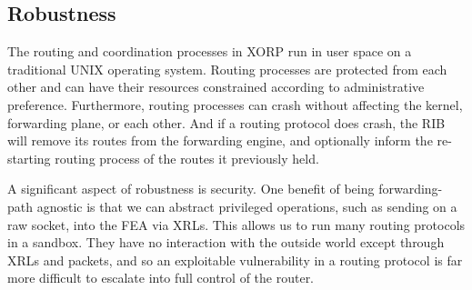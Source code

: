 \noindent{}

\subsection{Robustness}

The routing and coordination processes in XORP run in user space on a
traditional UNIX operating system.  Routing processes are protected
from each other and can have their resources constrained according to
administrative preference.  Furthermore, routing processes can crash
without affecting the kernel, forwarding plane, or each other.  And if
a routing protocol does crash, the RIB will remove its routes
from the forwarding engine, and optionally inform the re-starting
routing process of the routes it previously held.


A significant aspect of robustness is security.  One benefit of
being forwarding-path agnostic is that we can abstract
privileged operations, such as sending on a raw socket, into
the FEA via XRLs.  This allows us to run many routing protocols
in a sandbox. They have no interaction with the outside world except
through XRLs and packets, and so an exploitable vulnerability in a routing
protocol is far more difficult to escalate into full control of the
router.

